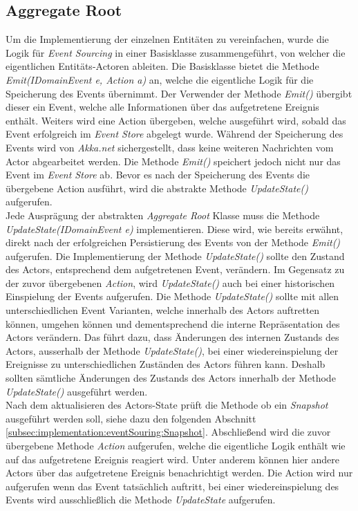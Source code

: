 \subsection{Aggregate Root}
Um die Implementierung der einzelnen Entitäten zu vereinfachen, wurde die Logik für \textit{Event Sourcing} in einer Basisklasse zusammengeführt, von welcher die eigentlichen Entitäts-Actoren ableiten. 
Die Basisklasse bietet die Methode \textit{Emit(IDomainEvent e, Action a)} an, welche die eigentliche Logik für die Speicherung des Events übernimmt. Der Verwender der Methode \textit{Emit()} übergibt dieser ein Event, welche alle Informationen über das aufgetretene Ereignis enthält. Weiters wird eine Action übergeben, welche ausgeführt wird, sobald das Event erfolgreich im \textit{Event Store} abgelegt wurde. Während der Speicherung des Events wird von \textit{Akka.net} sichergestellt, dass keine weiteren Nachrichten vom Actor abgearbeitet werden. Die Methode \textit{Emit()} speichert jedoch nicht nur das Event im \textit{Event Store} ab. Bevor es nach der Speicherung des Events die übergebene Action ausführt, wird die abstrakte Methode \textit{UpdateState()} aufgerufen. \\
Jede Ausprägung der abstrakten \textit{Aggregate Root} Klasse muss die Methode \textit{UpdateState(IDomainEvent e)} implementieren. Diese wird, wie bereits erwähnt, direkt nach der erfolgreichen Persistierung des Events von der Methode \textit{Emit()} aufgerufen. Die Implementierung der Methode \textit{UpdateState()} sollte den Zustand des Actors, entsprechend dem aufgetretenen Event, verändern. Im Gegensatz zu der zuvor übergebenen \textit{Action}, wird \textit{UpdateState()} auch bei einer historischen Einspielung der Events aufgerufen. Die Methode \textit{UpdateState()} sollte mit allen unterschiedlichen Event Varianten, welche innerhalb des Actors auftretten können, umgehen können und dementsprechend die interne Repräsentation des Actors verändern. Das führt dazu, dass Änderungen des internen Zustands des Actors, ausserhalb der Methode \textit{UpdateState()}, bei einer wiedereinspielung der Ereignisse zu unterschiedlichen Zuständen des Actors führen kann. Deshalb sollten sämtliche Änderungen des Zustands des Actors innerhalb der Methode \textit{UpdateState()} ausgeführt werden. \\
Nach dem aktualisieren des Actors-State prüft die Methode ob ein \textit{Snapshot} ausgeführt werden soll, siehe dazu den folgenden Abschnitt \ref{subsec:implementation:eventSouring:Snapshot}. Abschließend wird die zuvor übergebene Methode \textit{Action} aufgerufen, welche die eigentliche Logik enthält wie auf das aufgetretene Ereignis reagiert wird. Unter anderem können hier andere Actors über das aufgetretene Ereignis benachrichtigt werden. Die Action wird nur aufgerufen wenn das Event tatsächlich auftritt, bei einer wiedereinspielung des Events wird ausschließlich die Methode \textit{UpdateState} aufgerufen.  \\
